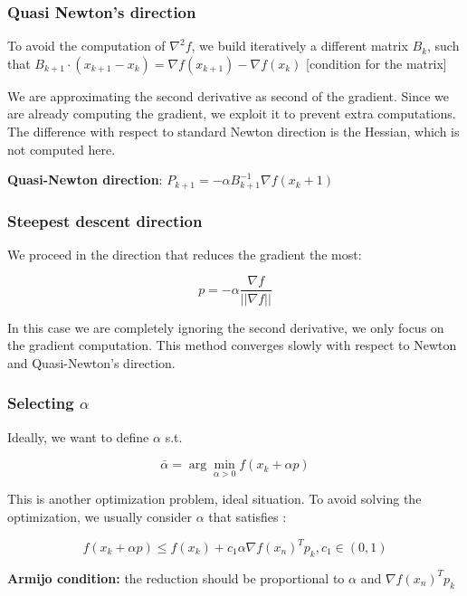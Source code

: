 \hypertarget{quasi-newtons-direction}{%
\subsubsection{Quasi Newton's direction}\label{quasi-newtons-direction}}

To avoid the computation of $\nabla^2 f$, we build iteratively a
different matrix $B_k$, such that
$B_{k+1}\cdot (x_{k+1}-x_k) = \nabla f(x_{k+1})-\nabla f(x_k)$
{[}condition for the matrix{]}

We are approximating the second derivative as second of the gradient.
Since we are already computing the gradient, we exploit it to prevent
extra computations. The difference with respect to standard Newton
direction is the Hessian, which is not computed here.

\textbf{Quasi-Newton direction}:
$P_{k+1}=- \alpha B_{k+1}^{-1} \nabla f(x_k+1)$

\hypertarget{steepest-descent-direction}{%
\subsubsection{Steepest descent
direction}\label{steepest-descent-direction}}

We proceed in the direction that reduces the gradient the most:

$$
p= -\alpha \frac{\nabla f}{||\nabla f||}
$$

In this case we are completely ignoring the second derivative, we only
focus on the gradient computation. This method converges slowly with
respect to Newton and Quasi-Newton's direction.

\hypertarget{selecting-alpha}{%
\subsubsection{\texorpdfstring{Selecting
$\alpha$}{Selecting }}\label{selecting-alpha}}

Ideally, we want to define $\alpha$ s.t.

$$
\bar{\alpha}= \arg \min_{\alpha>0} f(x_k+\alpha p)
$$

This is another optimization problem, ideal situation. To avoid solving
the optimization, we usually consider $\alpha$ that satisfies :

$$
f(x_k+\alpha p) \leq f(x_k) + c_1\alpha \nabla f(x_n)^T p_k, c_1 \in (0,1)
$$

\textbf{Armijo condition:} the reduction should be proportional to
$\alpha$ and $\nabla f(x_n)^T p_k$


